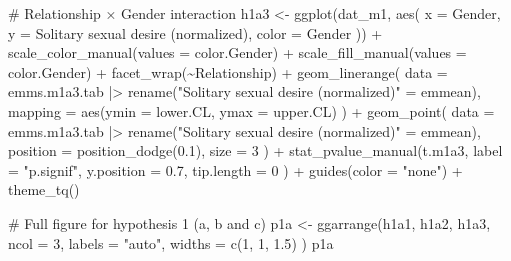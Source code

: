 \documentclass[
  bookmarksnumbered]{article}
\newenvironment{Shaded}{\begin{snugshade}}{\end{snugshade}}
\newcommand{\AttributeTok}[1]{\textcolor[rgb]{0.80,0.80,0.80}{#1}}
\newcommand{\CommentTok}[1]{\textcolor[rgb]{0.50,0.62,0.50}{#1}}
\newcommand{\DecValTok}[1]{\textcolor[rgb]{0.86,0.86,0.80}{#1}}
\newcommand{\FloatTok}[1]{\textcolor[rgb]{0.75,0.75,0.82}{#1}}
\newcommand{\FunctionTok}[1]{\textcolor[rgb]{0.94,0.94,0.56}{#1}}
\newcommand{\NormalTok}[1]{\textcolor[rgb]{0.80,0.80,0.80}{#1}}
\newcommand{\OtherTok}[1]{\textcolor[rgb]{0.94,0.94,0.56}{#1}}
\newcommand{\SpecialCharTok}[1]{\textcolor[rgb]{0.86,0.64,0.64}{#1}}
\newcommand{\StringTok}[1]{\textcolor[rgb]{0.80,0.58,0.58}{#1}}
\begin{document}
\begin{Shaded}
\begin{Highlighting}[]
\CommentTok{\# Relationship × Gender interaction}
\NormalTok{h1a3 }\OtherTok{\textless{}{-}} \FunctionTok{ggplot}\NormalTok{(dat\_m1, }\FunctionTok{aes}\NormalTok{(}
  \AttributeTok{x =}\NormalTok{ Gender, }\AttributeTok{y =} \StringTok{\textasciigrave{}}\AttributeTok{Solitary sexual desire (normalized)}\StringTok{\textasciigrave{}}\NormalTok{,}
  \AttributeTok{color =}\NormalTok{ Gender}
\NormalTok{)) }\SpecialCharTok{+}
  \FunctionTok{scale\_color\_manual}\NormalTok{(}\AttributeTok{values =}\NormalTok{ color.Gender) }\SpecialCharTok{+}
  \FunctionTok{scale\_fill\_manual}\NormalTok{(}\AttributeTok{values =}\NormalTok{ color.Gender) }\SpecialCharTok{+}
  \FunctionTok{facet\_wrap}\NormalTok{(}\SpecialCharTok{\textasciitilde{}}\NormalTok{Relationship) }\SpecialCharTok{+}
  \FunctionTok{geom\_linerange}\NormalTok{(}
    \AttributeTok{data =}\NormalTok{ emms.m1a3.tab }\SpecialCharTok{|\textgreater{}}
      \FunctionTok{rename}\NormalTok{(}\StringTok{"Solitary sexual desire (normalized)"} \OtherTok{=}\NormalTok{ emmean),}
    \AttributeTok{mapping =} \FunctionTok{aes}\NormalTok{(}\AttributeTok{ymin =}\NormalTok{ lower.CL, }\AttributeTok{ymax =}\NormalTok{ upper.CL)}
\NormalTok{  ) }\SpecialCharTok{+}
  \FunctionTok{geom\_point}\NormalTok{(}
    \AttributeTok{data =}\NormalTok{ emms.m1a3.tab }\SpecialCharTok{|\textgreater{}}
      \FunctionTok{rename}\NormalTok{(}\StringTok{"Solitary sexual desire (normalized)"} \OtherTok{=}\NormalTok{ emmean),}
    \AttributeTok{position =} \FunctionTok{position\_dodge}\NormalTok{(}\FloatTok{0.1}\NormalTok{),}
    \AttributeTok{size =} \DecValTok{3}
\NormalTok{  ) }\SpecialCharTok{+}
  \FunctionTok{stat\_pvalue\_manual}\NormalTok{(t.m1a3,}
    \AttributeTok{label =} \StringTok{"p.signif"}\NormalTok{,}
    \AttributeTok{y.position =} \FloatTok{0.7}\NormalTok{,}
    \AttributeTok{tip.length =} \DecValTok{0}
\NormalTok{  ) }\SpecialCharTok{+}
  \FunctionTok{guides}\NormalTok{(}\AttributeTok{color =} \StringTok{"none"}\NormalTok{) }\SpecialCharTok{+}
  \FunctionTok{theme\_tq}\NormalTok{()}

\CommentTok{\# Full figure for hypothesis 1 (a, b and c)}
\NormalTok{p1a }\OtherTok{\textless{}{-}} \FunctionTok{ggarrange}\NormalTok{(h1a1, h1a2, h1a3,}
  \AttributeTok{ncol =} \DecValTok{3}\NormalTok{,}
  \AttributeTok{labels =} \StringTok{"auto"}\NormalTok{,}
  \AttributeTok{widths =} \FunctionTok{c}\NormalTok{(}\DecValTok{1}\NormalTok{, }\DecValTok{1}\NormalTok{, }\FloatTok{1.5}\NormalTok{)}
\NormalTok{)}
\NormalTok{p1a}
\end{Highlighting}
\end{Shaded}
\end{document}
